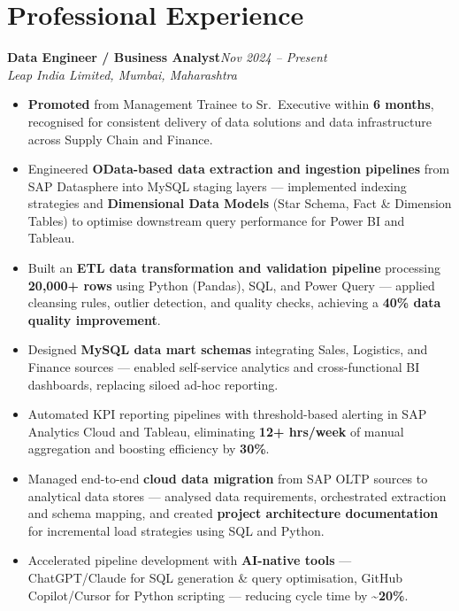 \documentclass[10pt, letterpaper]{article}
\newcommand{\role}[3]{%
  \vspace{2pt}%
  {\bfseries #1}\hfill{\small\color{muted}\textit{#3}}\\[-2pt]%
  {\small\color{muted}\textit{#2}}%
}
\begin{document}
\section{Professional Experience}

\role{Data Engineer / Business Analyst}{Leap India Limited, Mumbai, Maharashtra}{Nov 2024 -- Present}

\begin{itemize}
  \item \textbf{Promoted} from Management Trainee to Sr.\ Executive within \textbf{6 months}, recognised for consistent delivery of data solutions and data infrastructure across Supply Chain and Finance.
  \item Engineered \textbf{OData-based data extraction and ingestion pipelines} from SAP Datasphere into MySQL staging layers — implemented indexing strategies and \textbf{Dimensional Data Models} (Star Schema, Fact \& Dimension Tables) to optimise downstream query performance for Power BI and Tableau.
  \item Built an \textbf{ETL data transformation and validation pipeline} processing \textbf{20,000+ rows} using Python (Pandas), SQL, and Power Query — applied cleansing rules, outlier detection, and quality checks, achieving a \textbf{40\% data quality improvement}.
  \item Designed \textbf{MySQL data mart schemas} integrating Sales, Logistics, and Finance sources — enabled self-service analytics and cross-functional BI dashboards, replacing siloed ad-hoc reporting.
  \item Automated KPI reporting pipelines with threshold-based alerting in SAP Analytics Cloud and Tableau, eliminating \textbf{12+ hrs/week} of manual aggregation and boosting efficiency by \textbf{30\%}.
  \item Managed end-to-end \textbf{cloud data migration} from SAP OLTP sources to analytical data stores — analysed data requirements, orchestrated extraction and schema mapping, and created \textbf{project architecture documentation} for incremental load strategies using SQL and Python.
  \item Accelerated pipeline development with \textbf{AI-native tools} — ChatGPT/Claude for SQL generation \& query optimisation, GitHub Copilot/Cursor for Python scripting — reducing cycle time by \textbf{\textasciitilde20\%}.
\end{itemize}

\vspace{1pt}
\end{document}
